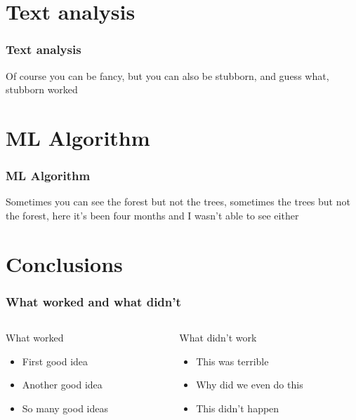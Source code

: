 \documentclass{beamer}
\begin{document}

\section{Text analysis}
\begin{frame}
\frametitle{Text analysis}
Of course you can be fancy, but you can also be stubborn, and guess what, stubborn worked
\end{frame}


\section{ML Algorithm}
\begin{frame}
\frametitle{ML Algorithm}
Sometimes you can see the forest but not the trees, sometimes the trees but not the forest, here it's been four months and I wasn't able to see either
\end{frame}


\section{Conclusions}
\begin{frame}
\frametitle{What worked and what didn't}
\begin{columns}
	\begin{column}{0.5\textwidth}
 	  	\begin{exampleblock}{\begin{center}What worked\end{center}}
			\justifying
			\begin{itemize}
  				\item First good idea
 				\item Another good idea
  				\item So many good ideas
  			\end{itemize}
		\end{exampleblock}
	\end{column}
	\begin{column}{0.5\textwidth}  
		\begin{alertblock}{\begin{center}What didn't work\end{center}}
			\begin{itemize}
  				\item This was terrible
 				\item Why did we even do this
  				\item This didn't happen
  			\end{itemize}
		\end{alertblock}
	\end{column}
\end{columns}
\end{frame}

\end{document}

